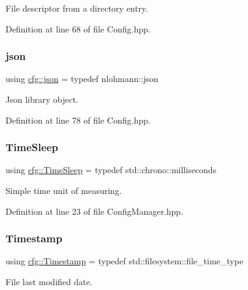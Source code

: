 File descriptor from a directory entry. 



Definition at line 68 of file Config.\+hpp.

\mbox{\label{namespacecfg_a4b03b67363586260311e07e8b27bd5ac}} 
\subsubsection{\texorpdfstring{json}{json}}
{\footnotesize\ttfamily using \hyperlink{namespacecfg_a4b03b67363586260311e07e8b27bd5ac}{cfg\+::json} = typedef nlohmann\+::json}



Json library object. 



Definition at line 78 of file Config.\+hpp.

\mbox{\label{namespacecfg_ab1a8f7060b6dfea6111c4449e81c6f8c}} 
\subsubsection{\texorpdfstring{Time\+Sleep}{TimeSleep}}
{\footnotesize\ttfamily using \hyperlink{namespacecfg_ab1a8f7060b6dfea6111c4449e81c6f8c}{cfg\+::\+Time\+Sleep} = typedef std\+::chrono\+::milliseconds}



Simple time unit of measuring. 



Definition at line 23 of file Config\+Manager.\+hpp.

\mbox{\label{namespacecfg_aa17d58439174a5af7fb3f37a3cdd6d0b}} 
\subsubsection{\texorpdfstring{Timestamp}{Timestamp}}
{\footnotesize\ttfamily using \hyperlink{namespacecfg_aa17d58439174a5af7fb3f37a3cdd6d0b}{cfg\+::\+Timestamp} = typedef std\+::filesystem\+::file\+\_\+time\+\_\+type}



File last modified date. 



